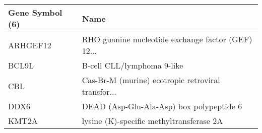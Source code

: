 \begin{tabular}{ll}
\toprule
Gene Symbol (6) &                                               Name \\
\midrule
       ARHGEF12 & RHO guanine nucleotide exchange factor (GEF) 12... \\
          BCL9L &                         B-cell CLL/lymphoma 9-like \\
            CBL & Cas-Br-M (murine) ecotropic retroviral transfor... \\
           DDX6 &           DEAD (Asp-Glu-Ala-Asp) box polypeptide 6 \\
          KMT2A &           lysine (K)-specific methyltransferase 2A \\
\bottomrule
\end{tabular}
